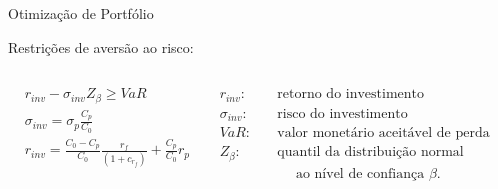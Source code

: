 






    \begin{frame}{Otimização de Portfólio}

        Restrições de aversão ao risco:

        \begin{columns}
            \begin{column}{0.5\textwidth}


                \begin{subequations}
                    \label{eq:otimizacao_4}
                    \begin{align}
                        & r_{inv} - \sigma_{inv} Z_{\beta} \geq VaR \\
                        & \sigma_{inv} = \sigma_{p} \frac{C_{p}}{C_{0}} \\
                        & r_{inv} = \frac{C_{0} - C_{p}}{C_{0}} \frac{r_{f}}{(1+c_{r_{f}})} + \frac{C_{p}}{C_{0}} r_{p}
                    \end{align}
                \end{subequations}

            \end{column}

            \begin{column}{0.5\textwidth}

                \begin{equation*}
                    \begin{aligned}
                        r_{inv} : \quad & \text{retorno do investimento} \\
                        \sigma_{inv} : \quad & \text{risco do investimento} \\
                        VaR : \quad & \text{valor monetário aceitável de perda} \\
                        Z_{\beta} : \quad & \text{quantil da distribuição normal padrão} \\
                        & \quad \text{ ao nível de confiança }\beta.
                    \end{aligned}
                \end{equation*}

            \end{column}
        \end{columns}

    \end{frame}



